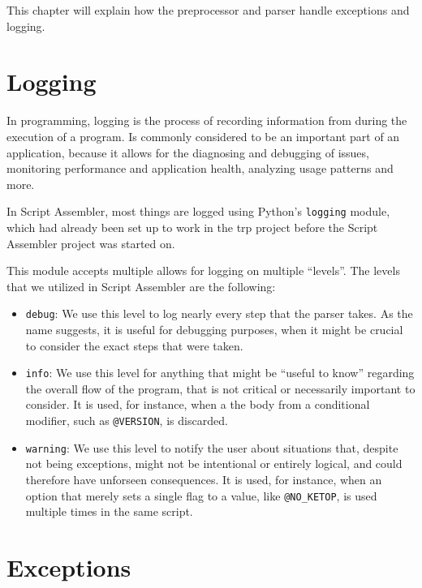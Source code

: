 This chapter will explain how the preprocessor and parser handle exceptions and logging. 

\section{Logging}

In programming, logging is the process of recording information from during the execution of a program. Is commonly considered to be an important part of an application, because it allows for the diagnosing and debugging of issues, monitoring performance and application health, analyzing usage patterns and more.\cite{logging}

In Script Assembler, most things are logged using Python's \verb|logging| module, which had already been set up to work in the \gls{trp} project before the Script Assembler project was started on. 

This module accepts multiple allows for logging on multiple ``levels''.\cite{py-logging} The levels that we utilized in Script Assembler are the following:

\begin{itemize}
    \item \verb|debug|: We use this level to log nearly every step that the parser takes. As the name suggests, it is useful for debugging purposes, when it might be crucial to consider the exact steps that were taken.
    \item \verb|info|: We use this level for anything that might be ``useful to know'' regarding the overall flow of the program, that is not critical or necessarily important to consider. It is used, for instance, when a the body from a conditional modifier, such as \verb|@VERSION|, is discarded.
    \item \verb|warning|: We use this level to notify the user about situations that, despite not being exceptions, might not be intentional or entirely logical, and could therefore have unforseen consequences. It is used, for instance, when an option that merely sets a single flag to a value, like \verb|@NO_KETOP|, is used multiple times in the same script. 
\end{itemize}

\section{Exceptions}


